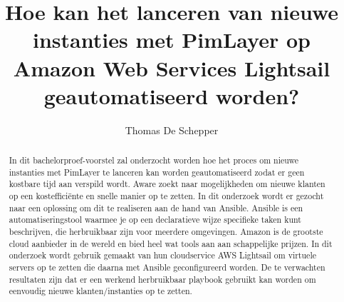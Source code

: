 \documentclass{hogent-article}
\title{Hoe kan het lanceren van nieuwe instanties met PimLayer op Amazon Web Services Lightsail geautomatiseerd worden?}
\author{Thomas De Schepper}
\begin{document}
\begin{abstract}
  {In dit bachelorproef-voorstel zal onderzocht worden hoe het proces om nieuwe instanties met PimLayer 
  te lanceren kan worden geautomatiseerd zodat er geen kostbare tijd aan verspild wordt. 
  Aware zoekt naar mogelijkheden om nieuwe klanten op een kostefficiënte en snelle manier op te zetten. In dit onderzoek wordt er 
  gezocht naar een oplossing om dit te realiseren aan de hand van Ansible. Ansible is een automatiseringstool waarmee je op 
  een declaratieve wijze specifieke taken kunt beschrijven, die herbruikbaar zijn voor meerdere omgevingen.
  Amazon is de grootste cloud aanbieder in de wereld en bied heel wat tools aan aan schappelijke prijzen. 
  In dit onderzoek wordt gebruik gemaakt van hun cloudservice AWS Lightsail om virtuele servers op te zetten die daarna met Ansible 
  geconfigureerd worden. De te verwachten resultaten zijn dat er een werkend herbruikbaar playbook gebruikt kan worden om eenvoudig 
  nieuwe klanten/instanties op te zetten.}
\end{abstract}

\tableofcontents



\printbibliography[heading=bibintoc]
\end{document}
